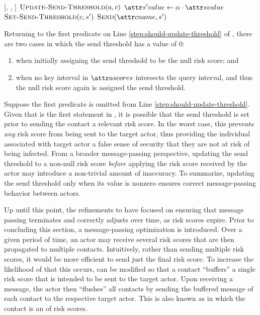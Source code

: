 \begin{function}{\nApplyRiskScore}[\vActor, \vContact, \vScore]
  \State $\cUpdateSendThreshold[\vActor, \vContact]$
  \If{$\aContactThresholdValue < \aScoreValue \AND \aContactTime + \pTimeBuffer > \aScoreTime$}
    \State $\aNewScoreValue \assign \pTransmissionRate \cdot \aScoreValue$
    \State $\cSetSendThreshold[\vContact, \vNewScore]$
    \State $\cSend[\aContactName, \vNewScore]$
  \EndIf
\end{function}

Returning to the first predicate on Line \ref{step:should-update-threshold} of \cUpdateSendThreshold{}, there are two cases in which the send threshold has a value of 0:
\begin{enumerate}
  \item when initially assigning the send threshold to be the null risk score; and
  \item when no key interval in $\aActorScores$ intersects the query interval, and thus the null risk score again is assigned the send threshold.
\end{enumerate}

Suppose the first predicate is omitted from Line \ref{step:should-update-threshold}. Given that \cUpdateSendThreshold{} is the first statement in \cApplyRiskScore{}, it is possible that the send threshold is set prior to sending the contact a relevant risk score. In the worst case, this prevents \emph{any} risk score from being sent to the target actor, thus providing the individual associated with target actor a false sense of security that they are not at risk of being infected. From a broader message-passing perspective, updating the send threshold to a non-null risk score \emph{before} applying the risk score received by the actor may introduce a non-trivial amount of inaccuracy. To summarize, updating the send threshold only when its value is nonzero ensures correct message-passing behavior between actors.

Up until this point, the refinements to \cApplyRiskScore{} have focused on ensuring that message passing terminates and correctly adjusts over time, as risk scores expire. Prior to concluding this section, a message-passing optimization is introduced. Over a given period of time, an actor may receive several risk scores that are then propagated to multiple contacts. Intuitively, rather than sending multiple risk scores, it would be more efficient to send just the final risk score. To increase the likelihood of that this occurs, \cApplyRiskScore{} can be modified so that a contact ``buffers'' a single risk score that is intended to be sent to the target actor. Upon receiving a  message, the actor then ``flushes'' all contacts by sending the buffered message of each contact to the respective target actor. This is also known as  in which the contact is an  of risk scores. 

